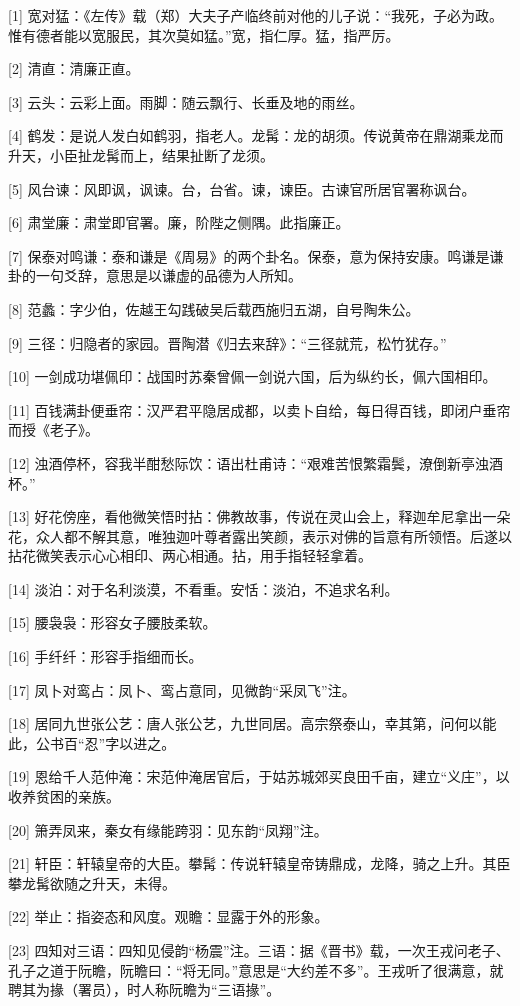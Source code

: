 \documentclass[12pt,UTF8]{ctexbook}
\begin{document}
[1] 宽对猛：《左传》载（郑）大夫子产临终前对他的儿子说：“我死，子必为政。惟有德者能以宽服民，其次莫如猛。”宽，指仁厚。猛，指严厉。

[2] 清直：清廉正直。

[3] 云头：云彩上面。雨脚：随云飘行、长垂及地的雨丝。

[4] 鹤发：是说人发白如鹤羽，指老人。龙髯：龙的胡须。传说黄帝在鼎湖乘龙而升天，小臣扯龙髯而上，结果扯断了龙须。

[5] 风台谏：风即讽，讽谏。台，台省。谏，谏臣。古谏官所居官署称讽台。

[6] 肃堂廉：肃堂即官署。廉，阶陛之侧隅。此指廉正。

[7] 保泰对鸣谦：泰和谦是《周易》的两个卦名。保泰，意为保持安康。鸣谦是谦卦的一句爻辞，意思是以谦虚的品德为人所知。

[8] 范蠡：字少伯，佐越王勾践破吴后载西施归五湖，自号陶朱公。

[9] 三径：归隐者的家园。晋陶潜《归去来辞》：“三径就荒，松竹犹存。”

[10] 一剑成功堪佩印：战国时苏秦曾佩一剑说六国，后为纵约长，佩六国相印。

[11] 百钱满卦便垂帘：汉严君平隐居成都，以卖卜自给，每日得百钱，即闭户垂帘而授《老子》。

[12] 浊酒停杯，容我半酣愁际饮：语出杜甫诗：“艰难苦恨繁霜鬓，潦倒新亭浊酒杯。”

[13] 好花傍座，看他微笑悟时拈：佛教故事，传说在灵山会上，释迦牟尼拿出一朵花，众人都不解其意，唯独迦叶尊者露出笑颜，表示对佛的旨意有所领悟。后遂以拈花微笑表示心心相印、两心相通。拈，用手指轻轻拿着。

[14] 淡泊：对于名利淡漠，不看重。安恬：淡泊，不追求名利。

[15] 腰袅袅：形容女子腰肢柔软。

[16] 手纤纤：形容手指细而长。

[17] 凤卜对鸾占：凤卜、鸾占意同，见微韵“采凤飞”注。

[18] 居同九世张公艺：唐人张公艺，九世同居。高宗祭泰山，幸其第，问何以能此，公书百“忍”字以进之。

[19] 恩给千人范仲淹：宋范仲淹居官后，于姑苏城郊买良田千亩，建立“义庄”，以收养贫困的亲族。

[20] 箫弄凤来，秦女有缘能跨羽：见东韵“凤翔”注。

[21] 轩臣：轩辕皇帝的大臣。攀髯：传说轩辕皇帝铸鼎成，龙降，骑之上升。其臣攀龙髯欲随之升天，未得。

[22] 举止：指姿态和风度。观瞻：显露于外的形象。

[23] 四知对三语：四知见侵韵“杨震”注。三语：据《晋书》载，一次王戎问老子、孔子之道于阮瞻，阮瞻曰：“将无同。”意思是“大约差不多”。王戎听了很满意，就聘其为掾（署员），时人称阮瞻为“三语掾”。
\end{document}
